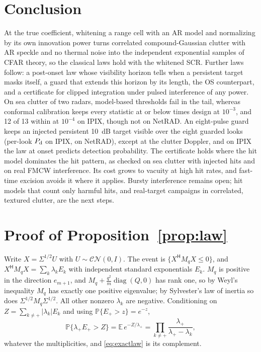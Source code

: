\documentclass[journal]{IEEEtran}
\newcommand{\PP}{\mathbb{P}}
\begin{document}
\section{Conclusion}
At the true coefficient, whitening a range cell with an AR model and normalizing by its own innovation power turns correlated compound-Gaussian clutter with AR speckle and no thermal noise into the independent exponential samples of CFAR theory, so the classical laws hold with the whitened SCR. Further laws follow: a post-onset law whose visibility horizon tells when a persistent target masks itself, a guard that extends this horizon by its length, the OS counterpart, and a certificate for clipped integration under pulsed interference of any power. On sea clutter of two radars, model-based thresholds fail in the tail, whereas conformal calibration keeps every statistic at or below \NetConfMaxThree{} times design at $10^{-3}$, and 12 of 13 within \LConfMaxFour{} at $10^{-4}$ on IPIX, though not on NetRAD. An eight-pulse guard keeps an injected persistent 10~dB target visible over the eight guarded looks (per-look $P_{\rm d}$ \GuardMeanLookEight{} on IPIX, \NetGuardEight{} on NetRAD), except at the clutter Doppler, and on IPIX the law at onset predicts detection probability. The certificate holds where the hit model dominates the hit pattern, as checked on sea clutter with injected hits and on real FMCW interference. Its cost grows to vacuity at high hit rates, and fast-time excision avoids it where it applies. Bursty interference remains open; hit models that count only harmful hits, and real-target campaigns in correlated, textured clutter, are the next steps.

\appendices
\section{Proof of Proposition~\ref{prop:law}}\label{app:law}
Write $X=\Sigma^{1/2}U$ with $U\sim\mathcal{CN}(0,I)$. The event is $\{X^{\mathsf H}M_qX\le0\}$, and $X^{\mathsf H}M_qX=\sum_k\lambda_kE_k$ with independent standard exponentials $E_k$. $M_q$ is positive in the direction $e_{m+1}$, and $M_q+\frac{q^2}{m}\operatorname{diag}(Q,0)$ has rank one, so by Weyl's inequality $M_q$ has exactly one positive eigenvalue; by Sylvester's law of inertia so does $\Sigma^{1/2}M_q\Sigma^{1/2}$. All other nonzero $\lambda_k$ are negative. Conditioning on $Z=\sum_{k\ne+}|\lambda_k|E_k$ and using $\PP\{E_+>z\}=e^{-z}$,
\[
\PP\{\lambda_+E_+>Z\}=\mathbb E\,e^{-Z/\lambda_+}=\prod_{k\ne+}\frac{\lambda_+}{\lambda_+-\lambda_k},
\]
whatever the multiplicities, and \eqref{eq:exactlaw} is its complement.
\end{document}
